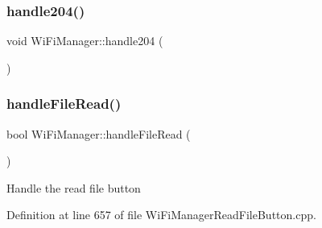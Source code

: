 \subsubsection{\texorpdfstring{handle204()}{handle204()}}
{\footnotesize\ttfamily void Wi\+Fi\+Manager\+::handle204 (\begin{DoxyParamCaption}{ }\end{DoxyParamCaption})\hspace{0.3cm}{\ttfamily [private]}}

\mbox{\label{class_wi_fi_manager_abed7fbbdab409fc8aba2a5c00f3d2db1}} 
\subsubsection{\texorpdfstring{handle\+File\+Read()}{handleFileRead()}}
{\footnotesize\ttfamily bool Wi\+Fi\+Manager\+::handle\+File\+Read (\begin{DoxyParamCaption}{ }\end{DoxyParamCaption})\hspace{0.3cm}{\ttfamily [private]}}

Handle the read file button 

Definition at line 657 of file Wi\+Fi\+Manager\+Read\+File\+Button.\+cpp.



